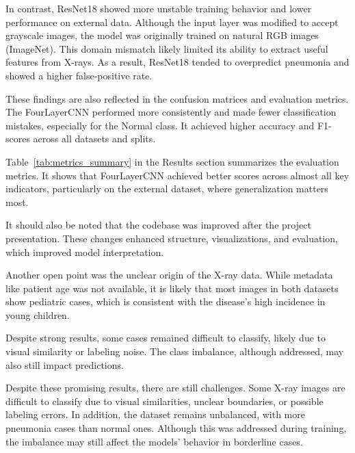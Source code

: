 \documentclass[a4paper,11pt]{article}
\begin{document}
\vspace{0.2cm}
In contrast, ResNet18 showed more unstable training behavior and lower performance on external data. Although the input layer was modified to accept grayscale images, the model was originally trained on natural RGB images (ImageNet). This domain mismatch likely limited its ability to extract useful features from X-rays. As a result, ResNet18 tended to overpredict pneumonia and showed a higher false-positive rate.

\vspace{0.2cm}
These findings are also reflected in the confusion matrices and evaluation metrics. The FourLayerCNN performed more consistently and made fewer classification mistakes, especially for the Normal class. It achieved higher accuracy and F1-scores across all datasets and splits.

\vspace{0.2cm}
Table~\ref{tab:metrics_summary} in the Results section summarizes the evaluation metrics. It shows that FourLayerCNN achieved better scores across almost all key indicators, particularly on the external dataset, where generalization matters most.

\vspace{0.2cm}It should also be noted that the codebase was improved after the project presentation. These changes enhanced structure, visualizations, and evaluation, which improved model interpretation.

\vspace{0.2cm}Another open point was the unclear origin of the X-ray data. While metadata like patient age was not available, it is likely that most images in both datasets show pediatric cases, which is consistent with the disease's high incidence in young children.

\vspace{0.2cm}Despite strong results, some cases remained difficult to classify, likely due to visual similarity or labeling noise. The class imbalance, although addressed, may also still impact predictions.

\vspace{0.2cm}Despite these promising results, there are still challenges. Some X-ray images are difficult to classify due to visual similarities, unclear boundaries, or possible labeling errors. In addition, the dataset remains unbalanced, with more pneumonia cases than normal ones. Although this was addressed during training, the imbalance may still affect the models’ behavior in borderline cases.
\end{document}
